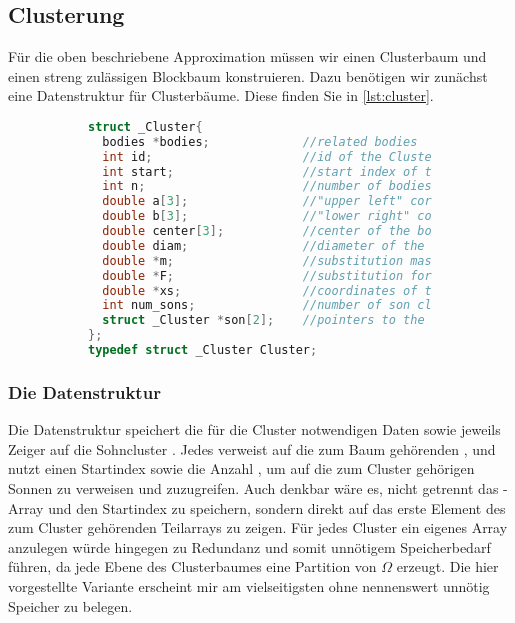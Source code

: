     \subsection{Clusterung}
    Für die oben beschriebene Approximation müssen wir einen Clusterbaum und einen streng zulässigen Blockbaum konstruieren.
    Dazu benötigen wir zunächst eine Datenstruktur für Clusterbäume. Diese finden Sie in \autoref{lst:cluster}.
    \begin{figure}[tb]
    \begin{subfigure}{0.9\textwidth}
    \begin{lstlisting}[language=C, label=lst:cluster, caption={Die Struktur \code{Cluster} vereint die Definition eines Clusters mit der eines Clusterbaumes.}, numbers=none]
struct _Cluster{
  bodies *bodies;             //related bodies
  int id;                     //id of the Cluster
  int start;                  //start index of the according subarray
  int n;                      //number of bodies in this Cluster
  double a[3];                //"upper left" corner of the bounding box
  double b[3];                //"lower right" corner of the bounding box
  double center[3];           //center of the bounding box
  double diam;                //diameter of the bounding box
  double *m;                  //substitution masses
  double *F;                  //substitution forces
  double *xs;                 //coordinates of the locations of submasses
  int num_sons;               //number of son clusters
  struct _Cluster *son[2];    //pointers to the son
};
typedef struct _Cluster Cluster;
    \end{lstlisting}
    \end{subfigure}
    \end{figure}
    
    \subsubsection{Die Datenstruktur}
    Die Datenstruktur speichert die für die Cluster notwendigen Daten sowie jeweils Zeiger auf die Sohncluster . Jedes  verweist auf die zum Baum gehörenden 
    , und nutzt einen Startindex  sowie die Anzahl , um auf die zum Cluster gehörigen Sonnen zu verweisen und zuzugreifen. Auch denkbar wäre es,
    nicht getrennt das -Array und den Startindex zu speichern, sondern direkt auf das erste Element des zum Cluster gehörenden Teilarrays zu zeigen. Für jedes Cluster ein eigenes
    Array anzulegen würde hingegen zu Redundanz und somit unnötigem Speicherbedarf führen, da jede Ebene des Clusterbaumes eine Partition von $\Omega$ erzeugt. Die hier vorgestellte Variante
    erscheint mir am vielseitigsten ohne nennenswert unnötig Speicher zu belegen.
    

